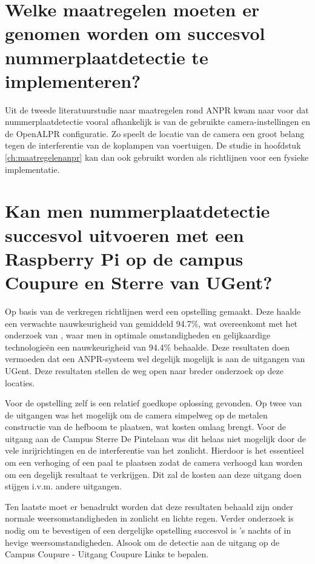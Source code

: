 \section{Welke maatregelen moeten er genomen worden om succesvol nummerplaatdetectie te implementeren?}
Uit de tweede literatuurstudie naar maatregelen rond ANPR kwam naar voor dat nummerplaatdetectie vooral afhankelijk is van de gebruikte camera-instellingen en de OpenALPR configuratie. Zo speelt de locatie van de camera een groot belang tegen de interferentie van de koplampen van voertuigen. De studie in hoofdstuk \ref{ch:maatregelenanpr} kan dan ook gebruikt worden als richtlijnen voor een fysieke implementatie.

\section{Kan men nummerplaatdetectie succesvol uitvoeren met een Raspberry Pi op de campus Coupure en Sterre van UGent?}
Op basis van de verkregen richtlijnen werd een opstelling gemaakt. Deze haalde een verwachte nauwkeurigheid van gemiddeld 94.7\%, wat overeenkomt met het onderzoek van \textcite{figuerola2016automated}, waar men in optimale omstandigheden en gelijkaardige technologieën een nauwkeurigheid van 94.4\% behaalde. Deze resultaten doen vermoeden dat een ANPR-systeem wel degelijk mogelijk is aan de uitgangen van UGent. Deze resultaten stellen de weg open naar breder onderzoek op deze locaties.

Voor de opstelling zelf is een relatief goedkope oplossing gevonden. Op twee van de uitgangen was het mogelijk om de camera simpelweg op de metalen constructie van de hefboom te plaatsen, wat kosten omlaag brengt. Voor de uitgang aan de Campus Sterre De Pintelaan was dit helaas niet mogelijk door de vele inrijrichtingen en de interferentie van het zonlicht. Hierdoor is het essentieel om een verhoging of een paal te plaatsen zodat de camera verhoogd kan worden om een degelijk resultaat te verkrijgen. Dit zal de kosten aan deze uitgang doen stijgen i.v.m. andere uitgangen.

Ten laatste moet er benadrukt worden dat deze resultaten behaald zijn onder normale weersomstandigheden in zonlicht en lichte regen. Verder onderzoek is nodig om te bevestigen of een dergelijke opstelling succesvol is 's nachts of in hevige weersomstandigheden. Alsook om de detectie aan de uitgang op de Campus Coupure - Uitgang Coupure Links te bepalen.